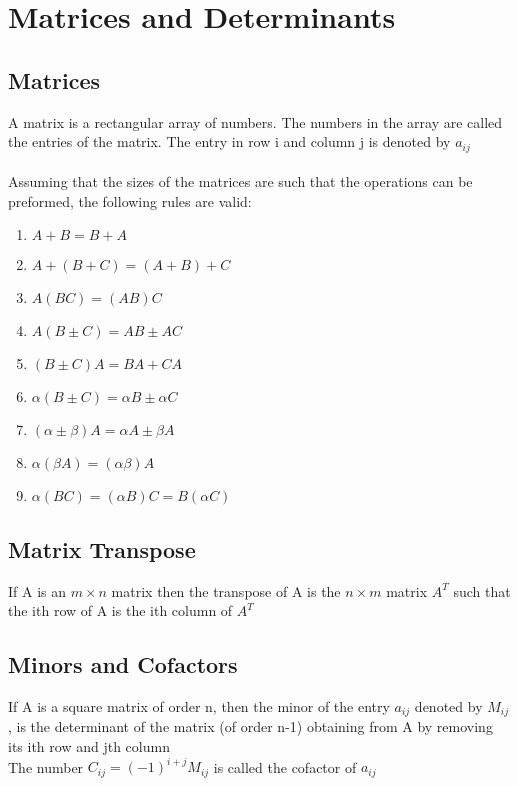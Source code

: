 \documentclass{article}[18pt]
\begin{document}
\section{Matrices and Determinants}
\subsection{Matrices}
A matrix is a rectangular array of numbers. The numbers in the array are called the entries of the matrix. The entry in row i and column j is denoted by $a_{ij}$\\
\\
Assuming that the sizes of the matrices are such that the operations can be preformed, the following rules are valid:
\begin{enumerate}
	\item $A+B=B+A$
	\item $A+(B+C)=(A+B)+C$
	\item $A(BC)=(AB)C$
	\item $A(B\pm C)=AB\pm AC$
	\item $(B\pm C)A=BA+CA$
	\item $\alpha(B\pm C)=\alpha B\pm \alpha C$
	\item $(\alpha \pm \beta)A=\alpha A\pm \beta A$
	\item $\alpha(\beta A)=(\alpha\beta)A$
	\item $\alpha(BC)=(\alpha B)C=B(\alpha C)$ 
\end{enumerate}
\subsection{Matrix Transpose}
If A is an $m\times n$ matrix then the transpose of A is the $n\times m$ matrix $A^T$ such that the ith row of A is the ith column of $A^T$
\subsection{Minors and Cofactors}
If A is a square matrix of order n, then the minor of the entry $a_{ij}$ denoted by $M_{ij}$, is the determinant of 
the matrix (of order n-1) obtaining from A by removing its ith row and jth column\\
The number $C_{ij}=(-1)^{i+j}M_{ij}$ is called the cofactor of $a_{ij}$
\end{document}
